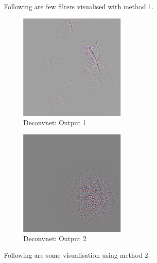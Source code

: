 \documentclass{article} %
\begin{document}
Following are few filters visualised with method 1.

\begin{figure}[h]
  \begin{center}
  \includegraphics[width=200]{m2_1.png}
  \end{center}
  \caption{Deconvnet: Output 1}
\end{figure}

\begin{figure}[h]
  \begin{center}
  \includegraphics[width=200]{m2_2.png}
  \end{center}
  \caption{Deconvnet: Output 2}
\end{figure}

Following are some visualisation using method 2.
\end{document}

